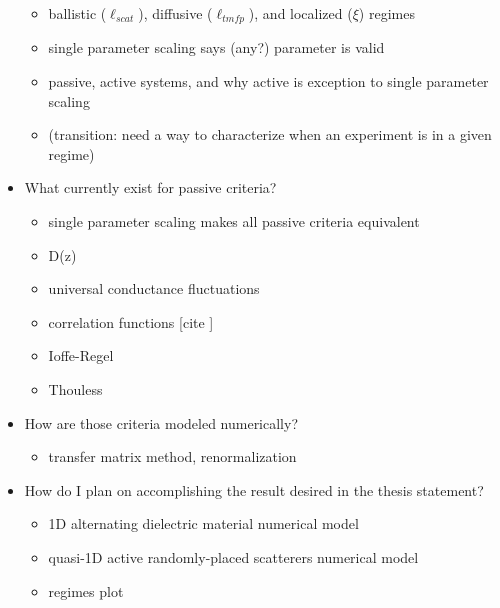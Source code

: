 \documentclass[pdftex]{article}
\begin{document}
\begin{itemize}
 \begin{itemize}
  \item ballistic ($\ell_{scat}$), diffusive ($\ell_{tmfp}$), and localized ($\xi$) regimes 
  \item single parameter scaling says (any?) parameter is valid \cite{1979_Anderson}
  \item passive, active systems, and why active is exception to single parameter scaling
  \item (transition: need a way to characterize when an experiment is in a given regime)
 \end{itemize}
 \item What currently exist for passive criteria?
 \begin{itemize}
  \item single parameter scaling makes all passive criteria equivalent \cite{1979_Anderson}
  \item D(z) \cite{1980_Vollhardt_Wolfle}
  \item universal conductance fluctuations \cite{2000_chabanov_nature}
  \item correlation functions [cite ]
  \item Ioffe-Regel \cite{1960_Ioffe_criterion}
  \item Thouless \cite{1977_Thouless}
 \end{itemize}
 \item How are those criteria modeled numerically?
 \begin{itemize}
  \item transfer matrix method, renormalization
 \end{itemize}
 \item How do I plan on accomplishing the result desired in the thesis statement?
 \begin{itemize}
  \item 1D alternating dielectric material numerical model
  \item quasi-1D active randomly-placed scatterers numerical model
  \item regimes plot
 \end{itemize}
\end{itemize}
\end{document}

